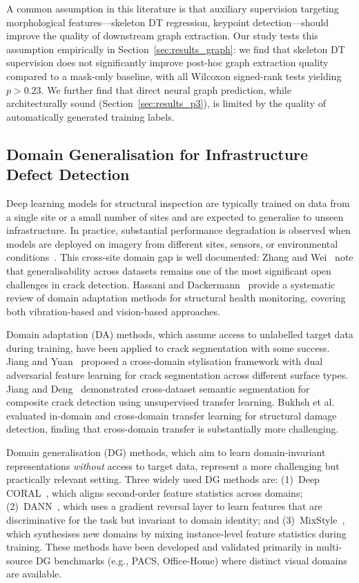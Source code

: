 \documentclass[preprint,12pt]{elsarticle}
\begin{document}
A common assumption in this literature is that auxiliary supervision targeting morphological features---skeleton DT regression, keypoint detection---should improve the quality of downstream graph extraction. Our study tests this assumption empirically in Section~\ref{sec:results_graph}: we find that skeleton DT supervision does not significantly improve post-hoc graph extraction quality compared to a mask-only baseline, with all Wilcoxon signed-rank tests yielding $p > 0.23$. We further find that direct neural graph prediction, while architecturally sound (Section~\ref{sec:results_p3}), is limited by the quality of automatically generated training labels.

\subsection{Domain Generalisation for Infrastructure Defect Detection}
\label{sec:rw_dg}

Deep learning models for structural inspection are typically trained on data from a single site or a small number of sites and are expected to generalise to unseen infrastructure. In practice, substantial performance degradation is observed when models are deployed on imagery from different sites, sensors, or environmental conditions~\cite{koch2015review, bukhsh2021damage}. This cross-site domain gap is well documented: Zhang and Wei~\cite{zhang2025crackreview} note that generalisability across datasets remains one of the most significant open challenges in crack detection. Hassani and Dackermann~\cite{hassani2025dashm} provide a systematic review of domain adaptation methods for structural health monitoring, covering both vibration-based and vision-based approaches.

Domain adaptation (DA) methods, which assume access to unlabelled target data during training, have been applied to crack segmentation with some success. Jiang and Yuan~\cite{jiang2025udacrack} proposed a cross-domain stylisation framework with dual adversarial feature learning for crack segmentation across different surface types. Jiang and Deng~\cite{jiang2025crossdataset} demonstrated cross-dataset semantic segmentation for composite crack detection using unsupervised transfer learning. Bukhsh et al.~\cite{bukhsh2021damage} evaluated in-domain and cross-domain transfer learning for structural damage detection, finding that cross-domain transfer is substantially more challenging.

Domain generalisation (DG) methods, which aim to learn domain-invariant representations \emph{without} access to target data, represent a more challenging but practically relevant setting. Three widely used DG methods are: (1)~Deep CORAL~\cite{sun2016coral}, which aligns second-order feature statistics across domains; (2)~DANN~\cite{ganin2016dann}, which uses a gradient reversal layer to learn features that are discriminative for the task but invariant to domain identity; and (3)~MixStyle~\cite{zhou2021mixstyle, zhou2023mixstyle}, which synthesises new domains by mixing instance-level feature statistics during training. These methods have been developed and validated primarily in multi-source DG benchmarks (e.g., PACS, Office-Home) where distinct visual domains are available.
\end{document}
